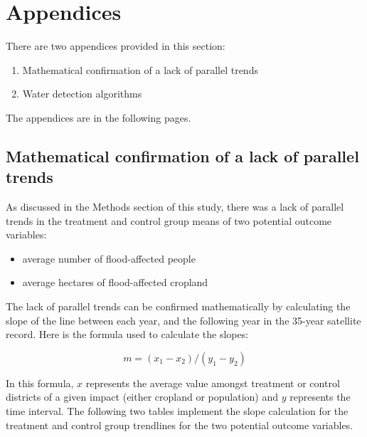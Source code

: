 \chapter{Appendices}

There are two appendices provided in this section:

\begin{enumerate}
    \item Mathematical confirmation of a lack of parallel trends
    \item Water detection algorithms
\end{enumerate}

The appendices are in the following pages.

\newpage

\section{Mathematical confirmation of a lack of parallel trends}

As discussed in the Methods section of this study, there was a lack of parallel trends in the treatment and control group means of two potential outcome variables:

\begin{itemize}
    \item average number of flood-affected people
    \item average hectares of flood-affected cropland
\end{itemize}

The lack of parallel trends can be confirmed mathematically by calculating the slope of the line between each year, and the following year in the 35-year satellite record. Here is the formula used to calculate the slopes:

\[ {m} = ({x_1 - x_2}) / ({y_1 - y_2}) \]

In this formula, \({x}\) represents the average value amongst treatment or control districts of a given impact (either cropland or population) and \({y}\) represents the time interval. The following two tables implement the slope calculation for the treatment and control group trendlines for the two potential outcome variables.

